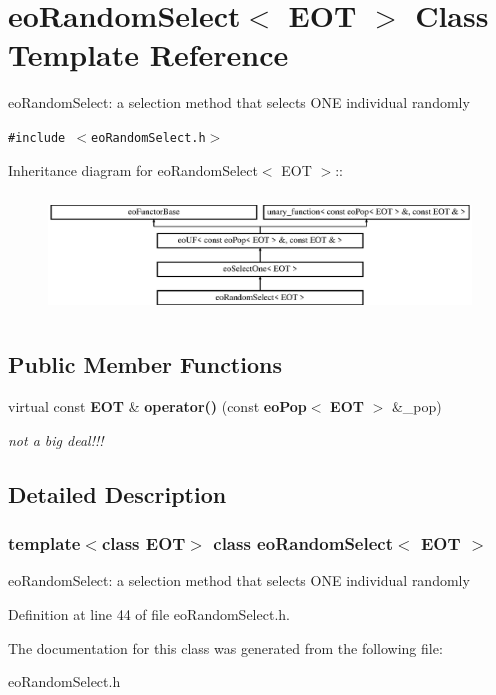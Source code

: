 \section{eo\-Random\-Select$<$ EOT $>$ Class Template Reference}
\label{classeo_random_select}
eo\-Random\-Select: a selection method that selects ONE individual randomly  


{\tt \#include $<$eo\-Random\-Select.h$>$}

Inheritance diagram for eo\-Random\-Select$<$ EOT $>$::\begin{figure}[H]
\begin{center}
\leavevmode
\includegraphics[height=3.23699cm]{classeo_random_select}
\end{center}
\end{figure}
\subsection*{Public Member Functions}
\begin{CompactItemize}
\item 
virtual const {\bf EOT} \& {\bf operator()} (const {\bf eo\-Pop}$<$ {\bf EOT} $>$ \&\_\-pop)\label{classeo_random_select_a0}

\begin{CompactList}\small\item\em not a big deal!!! \item\end{CompactList}\end{CompactItemize}


\subsection{Detailed Description}
\subsubsection*{template$<$class EOT$>$ class eo\-Random\-Select$<$ EOT $>$}

eo\-Random\-Select: a selection method that selects ONE individual randomly 



Definition at line 44 of file eo\-Random\-Select.h.

The documentation for this class was generated from the following file:\begin{CompactItemize}
\item 
eo\-Random\-Select.h\end{CompactItemize}
